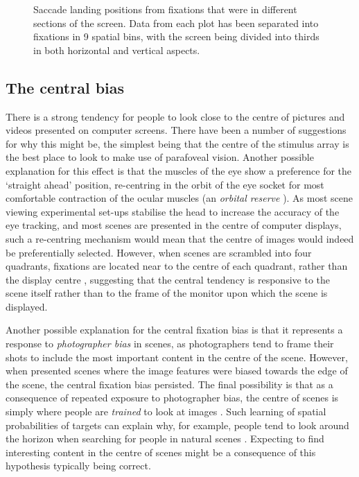 \begin{figure}[htb]
\caption{Saccade landing positions from fixations that were in different sections of the screen. Data from each plot has been separated into fixations in 9 spatial bins, with the screen being divided into thirds in both horizontal and vertical aspects.}
\label{fig:empiricalSaccadicFlow}
\end{figure}

\subsection{The central bias}
 
There is a strong tendency for people to look close to the centre of pictures \citep{tatler2007, tatler2005, canosa2003, clarke-tatler2014} and videos \citep{tseng2009,loschky2015} presented on computer screens. There have been a number of suggestions for why this might be, the simplest being that the centre of the stimulus array is the best place to look to make use of parafoveal vision. Another possible explanation for this effect is that the muscles of the eye show a preference for the `straight ahead' position, re-centring in the orbit of the eye socket for most comfortable contraction of the ocular muscles (an \emph{orbital reserve} \citep{fuller1996}). As most scene viewing experimental set-ups stabilise the head to increase the accuracy of the eye tracking, and most scenes are presented in the centre of computer displays, such a re-centring mechanism would mean that the centre of images would indeed be preferentially selected. However, when scenes are scrambled into four quadrants, fixations are located near to the centre of each quadrant, rather than the display centre \citep{stainer2013}, suggesting that the central tendency is responsive to the scene itself rather than to the frame of the monitor upon which the scene is displayed. 

Another possible explanation for the central fixation bias is that it represents a response to \emph{photographer bias} in scenes, as photographers tend to frame their shots to include the most important content in the centre of the scene. However, when \cite{tatler2007} presented scenes where the image features were biased towards the edge of the scene, the central fixation bias persisted. The final possibility is that as a consequence of repeated exposure to photographer bias, the centre of scenes is simply where people are \emph{trained} to look at images \citep{parkhurst2002}. Such learning of spatial probabilities of targets can explain why, for example, people tend to look around the horizon when searching for people in natural scenes \citep{birmingham2009, torralba2006, ehinger2009}. Expecting to find interesting content in the centre of scenes might be a consequence of this hypothesis typically being correct. 

